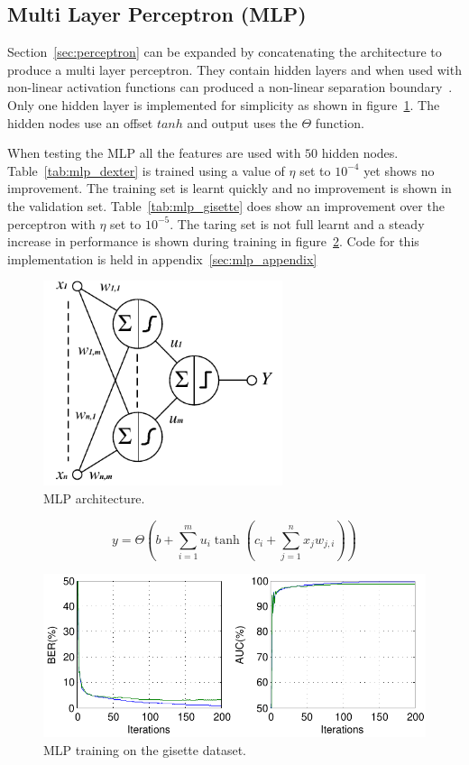 \documentclass{ecsarticle}     %
\begin{document}
\subsection{Multi Layer Perceptron (MLP)}
Section~\ref{sec:perceptron} can be expanded by concatenating the architecture to produce a multi layer perceptron.
They contain hidden layers and when used with non-linear activation functions can produced a non-linear separation boundary~\citep{bennett01ml}.
Only one hidden layer is implemented for simplicity as shown in figure~\ref{fig:mlp}.
The hidden nodes use an offset $tanh$ and output uses the $\Theta$ function.


When testing the MLP all the features are used with $50$ hidden nodes.
Table~\ref{tab:mlp_dexter} is trained using a value of $\eta$ set to $10^{-4}$ yet shows no improvement.
The training set is learnt quickly and no improvement is shown in the validation set.
Table~\ref{tab:mlp_gisette} does show an improvement over the perceptron with $\eta$ set to $10^{-5}$.
The taring set is not full learnt and a steady increase in performance is shown during training in figure~\ref{fig:mlp_train}.
Code for this implementation is held in appendix~\ref{sec:mlp_appendix}


\begin{figure}[ht]
   \centering
    \includegraphics[width = 7cm]{MLP.pdf}
   \caption{MLP architecture.}
   \label{fig:mlp}
\end{figure}

\begin{equation}
   y = \Theta \left(b + \sum_{i=1}^{m} u_i \tanh \left(c_i + \sum_{j=1}^{n} x_j w_{j,i}\right)  \right) 
   \label{eqn:mlp}
\end{equation}

\begin{figure}[ht]
   \centering
    \includegraphics[width = 14cm]{MLP_Train.pdf}
   \caption{MLP training on the gisette dataset.}
   \label{fig:mlp_train}
\end{figure}
\end{document}
